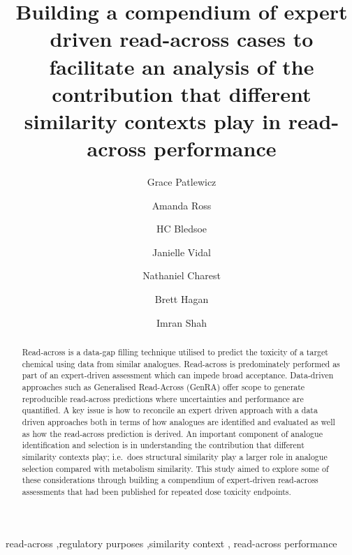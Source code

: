 \documentclass[
  super,
  preprint,
  3p]{elsarticle}
\begin{document}
\begin{frontmatter}
\title{Building a compendium of expert driven read-across cases to
facilitate an analysis of the contribution that different similarity
contexts play in read-across performance}
\author[1]{Grace Patlewicz%
%
}
\author[2]{Amanda Ross%
%
}

\author[2]{HC Bledsoe%
%
}

\author[2]{Janielle Vidal%
%
}

\author[1]{Nathaniel Charest%
%
}

\author[1,3]{Brett Hagan%
%
}

\author[1]{Imran Shah%
%
}










        
\begin{abstract}
Read-across is a data-gap filling technique utilised to predict the
toxicity of a target chemical using data from similar analogues.
Read-across is predominately performed as part of an expert-driven
assessment which can impede broad acceptance. Data-driven approaches
such as Generalised Read-Across (GenRA) offer scope to generate
reproducible read-across predictions where uncertainties and performance
are quantified. A key issue is how to reconcile an expert driven
approach with a data driven approaches both in terms of how analogues
are identified and evaluated as well as how the read-across prediction
is derived. An important component of analogue identification and
selection is in understanding the contribution that different similarity
contexts play; i.e.~does structural similarity play a larger role in
analogue selection compared with metabolism similarity. This study aimed
to explore some of these considerations through building a compendium of
expert-driven read-across assessments that had been published for
repeated dose toxicity endpoints.
\end{abstract}





\begin{keyword}
    read-across \sep regulatory purposes \sep similarity context \sep 
    read-across performance
\end{keyword}
\end{frontmatter}
    
\end{document}
